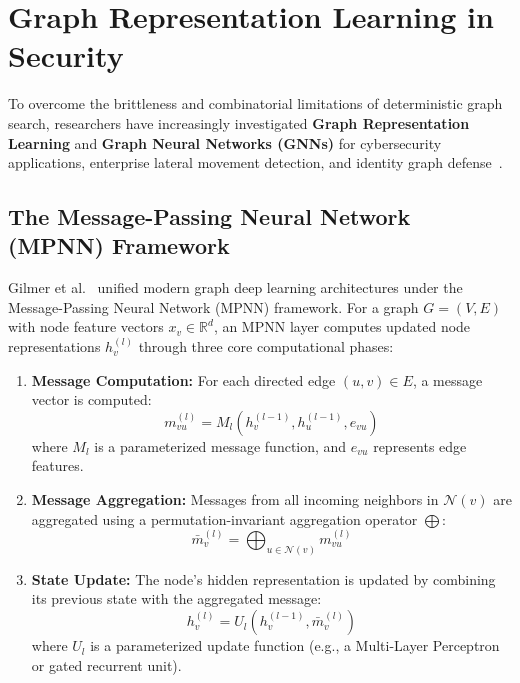 \section{Graph Representation Learning in Security}
To overcome the brittleness and combinatorial limitations of deterministic graph search, researchers have increasingly investigated \textbf{Graph Representation Learning} and \textbf{Graph Neural Networks (GNNs)} for cybersecurity applications, enterprise lateral movement detection, and identity graph defense~\cite{goel2025coevolutionary,king2023euler,guo2022practical,zhou2024lateral}.

\subsection{The Message-Passing Neural Network (MPNN) Framework}
Gilmer et al.~\cite{gilmer2017neural} unified modern graph deep learning architectures under the Message-Passing Neural Network (MPNN) framework. For a graph $G = (V, E)$ with node feature vectors $x_v \in \mathbb{R}^d$, an MPNN layer computes updated node representations $h_v^{(l)}$ through three core computational phases:
\begin{enumerate}
    \item \textbf{Message Computation:} For each directed edge $(u, v) \in E$, a message vector is computed:
    \begin{equation}
    m_{vu}^{(l)} = M_l \left( h_v^{(l-1)}, h_u^{(l-1)}, e_{vu} \right)
    \end{equation}
    where $M_l$ is a parameterized message function, and $e_{vu}$ represents edge features.
    
    \item \textbf{Message Aggregation:} Messages from all incoming neighbors in $\mathcal{N}(v)$ are aggregated using a permutation-invariant aggregation operator $\bigoplus$:
    \begin{equation}
    \bar{m}_v^{(l)} = \bigoplus_{u \in \mathcal{N}(v)} m_{vu}^{(l)}
    \end{equation}
    
    \item \textbf{State Update:} The node's hidden representation is updated by combining its previous state with the aggregated message:
    \begin{equation}
    h_v^{(l)} = U_l \left( h_v^{(l-1)}, \bar{m}_v^{(l)} \right)
    \end{equation}
    where $U_l$ is a parameterized update function (e.g., a Multi-Layer Perceptron or gated recurrent unit).
\end{enumerate}

